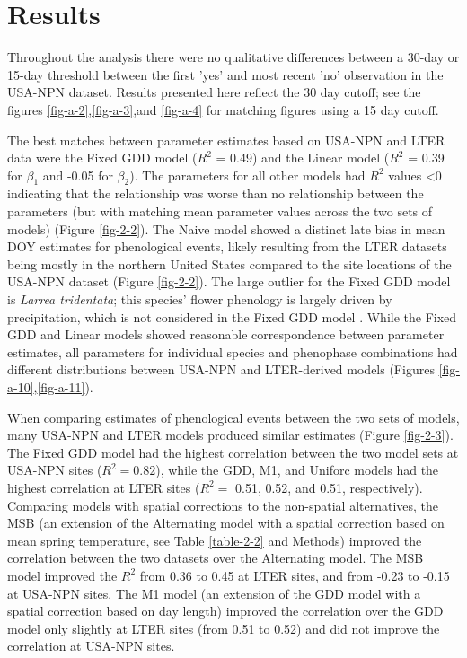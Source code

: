 \section{Results}

Throughout the analysis there were no qualitative differences between a 30-day or 15-day threshold between the first 'yes' and most recent 'no' observation in the USA-NPN dataset. Results presented here reflect the 30 day cutoff; see the figures \ref{fig-a-2},\ref{fig-a-3},and \ref{fig-a-4} for matching figures using a 15 day cutoff. 

The best matches between parameter estimates based on USA-NPN and LTER data were the Fixed GDD model ($R^2$ = 0.49) and the Linear model ($R^2$ = 0.39 for $\beta_{1}$ and -0.05 for $\beta_{2}$). The parameters for all other models had $R^2$ values \textless 0 indicating that the relationship was worse than no relationship between the parameters (but with matching mean parameter values across the two sets of models) (Figure \ref{fig-2-2}). The Naive model showed a distinct late bias in mean DOY estimates for phenological events, likely resulting from the LTER datasets being mostly in the northern United States compared to the site locations of the USA-NPN dataset (Figure \ref{fig-2-2}). The large outlier for the Fixed GDD model is \textit{Larrea tridentata}; this species' flower phenology is largely driven by precipitation, which is not considered in the Fixed GDD model \citep{beatley1974}. While the Fixed GDD and Linear models showed reasonable correspondence between parameter estimates, all parameters for individual species and phenophase combinations had different distributions between USA-NPN and LTER-derived models (Figures \ref{fig-a-10},\ref{fig-a-11}).

When comparing estimates of phenological events between the two sets of models, many USA-NPN and LTER models produced similar estimates (Figure \ref{fig-2-3}). The Fixed GDD model had the highest correlation between the two model sets at USA-NPN sites ($R^2 = 0.82$), while the GDD, M1, and Uniforc models had the highest correlation at LTER sites ($R^2 =$ 0.51, 0.52, and 0.51, respectively). Comparing models with spatial corrections to the non-spatial alternatives, the MSB (an extension of the Alternating model with a spatial correction based on mean spring temperature, see Table \ref{table-2-2} and Methods) improved the correlation between the two datasets over the Alternating model. The MSB model improved the $R^2$ from 0.36 to 0.45 at LTER sites, and from -0.23 to -0.15 at USA-NPN sites. The M1 model (an extension of the GDD model with a spatial correction based on day length) improved the correlation over the GDD model only slightly at LTER sites (from 0.51 to 0.52) and did not improve the correlation at USA-NPN sites. 

